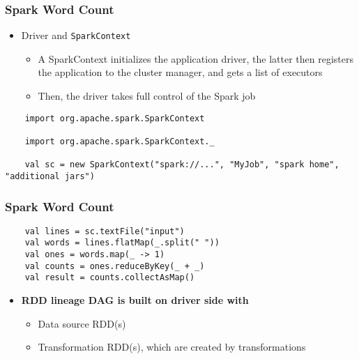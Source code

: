 \begin{frame}[fragile] 
\frametitle{Spark Word Count}

\begin{itemize}
	\item Driver and \texttt{SparkContext}
	\begin{itemize}
		\item A SparkContext initializes the application driver, the latter then registers the application to the cluster manager, and gets a list of executors
		\item Then, the driver takes full control of the Spark job
	\end{itemize}
\end{itemize}

\begin{lstlisting}
	import org.apache.spark.SparkContext

	import org.apache.spark.SparkContext._

	val sc = new SparkContext("spark://...", "MyJob", "spark home", "additional jars") 
\end{lstlisting}

\end{frame}

\begin{frame}[fragile] 
\frametitle{Spark Word Count}
\begin{lstlisting}
	val lines = sc.textFile("input")
	val words = lines.flatMap(_.split(" ")) 
	val ones = words.map(_ -> 1)
	val counts = ones.reduceByKey(_ + _) 
	val result = counts.collectAsMap()
\end{lstlisting}

\begin{itemize}
	\item {\bf RDD lineage DAG is built on driver side with}
	\begin{itemize}
		\item Data source RDD(s)
		\item Transformation RDD(s), which are created by transformations
	\end{itemize}
\end{itemize}

\end{frame}
